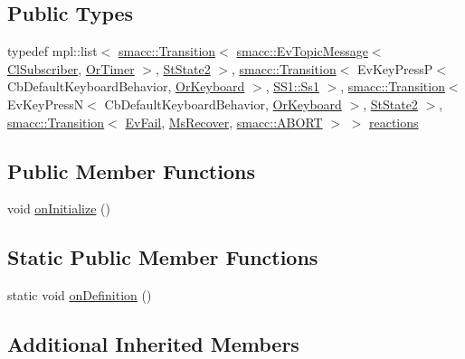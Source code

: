 \subsection*{Public Types}
\begin{DoxyCompactItemize}
\item 
typedef mpl\+::list$<$ \hyperlink{classsmacc_1_1Transition}{smacc\+::\+Transition}$<$ \hyperlink{structsmacc_1_1default__events_1_1EvTopicMessage}{smacc\+::\+Ev\+Topic\+Message}$<$ \hyperlink{classsm__three__some_1_1cl__subscriber_1_1ClSubscriber}{Cl\+Subscriber}, \hyperlink{classsm__three__some_1_1OrTimer}{Or\+Timer} $>$, \hyperlink{structsm__three__some_1_1StState2}{St\+State2} $>$, \hyperlink{classsmacc_1_1Transition}{smacc\+::\+Transition}$<$ Ev\+Key\+PressP$<$ Cb\+Default\+Keyboard\+Behavior, \hyperlink{classsm__three__some_1_1OrKeyboard}{Or\+Keyboard} $>$, \hyperlink{structsm__three__some_1_1SS1_1_1Ss1}{S\+S1\+::\+Ss1} $>$, \hyperlink{classsmacc_1_1Transition}{smacc\+::\+Transition}$<$ Ev\+Key\+PressN$<$ Cb\+Default\+Keyboard\+Behavior, \hyperlink{classsm__three__some_1_1OrKeyboard}{Or\+Keyboard} $>$, \hyperlink{structsm__three__some_1_1StState2}{St\+State2} $>$, \hyperlink{classsmacc_1_1Transition}{smacc\+::\+Transition}$<$ \hyperlink{structsm__three__some_1_1EvFail}{Ev\+Fail}, \hyperlink{classsm__three__some_1_1MsRecover}{Ms\+Recover}, \hyperlink{structsmacc_1_1default__transition__tags_1_1ABORT}{smacc\+::\+A\+B\+O\+RT} $>$ $>$ \hyperlink{structsm__three__some_1_1StState1_a4d8dd5325392d5aaf8b5cfc0b3e51988}{reactions}
\end{DoxyCompactItemize}
\subsection*{Public Member Functions}
\begin{DoxyCompactItemize}
\item 
void \hyperlink{structsm__three__some_1_1StState1_ac57412e5c59fa38f9a58be3b56b62762}{on\+Initialize} ()
\end{DoxyCompactItemize}
\subsection*{Static Public Member Functions}
\begin{DoxyCompactItemize}
\item 
static void \hyperlink{structsm__three__some_1_1StState1_a69bbe0bcf47acd2ea803972785c23589}{on\+Definition} ()
\end{DoxyCompactItemize}
\subsection*{Additional Inherited Members}


